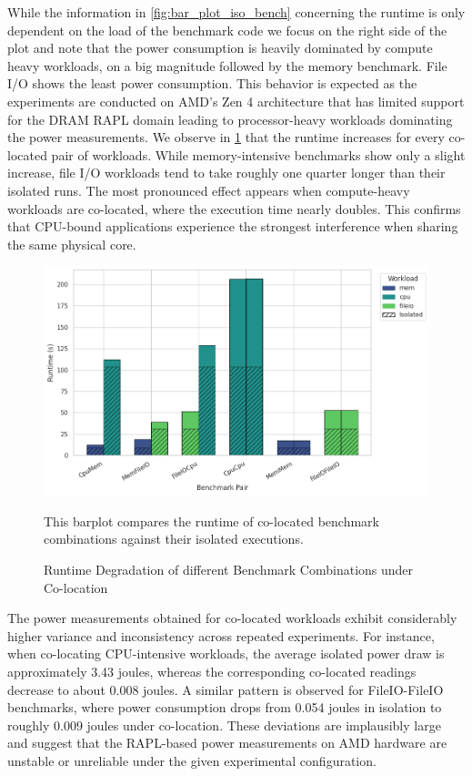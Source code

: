 While the information in \ref{fig:bar_plot_iso_bench} concerning the runtime is only dependent on the load of the benchmark code we focus on the right side of the plot and note that the power consumption is heavily dominated by compute heavy workloads, on a big magnitude followed by the memory benchmark. File I/O shows the least power consumption. This behavior is expected as the experiments are conducted on AMD's Zen 4 architecture that has limited support for the DRAM  RAPL domain leading to processor-heavy workloads dominating the power measurements.
We observe in \ref{fig:bar_plot_colo_bench} that the runtime increases for every co-located pair of workloads. While memory-intensive benchmarks show only a slight increase, file I/O workloads tend to take roughly one quarter longer than their isolated runs. The most pronounced effect appears when compute-heavy workloads are co-located, where the execution time nearly doubles. This confirms that CPU-bound applications experience the strongest interference when sharing the same physical core.

\begin{figure}[H]
    \includegraphics[scale=0.5]{fig/06/06-barplot-colo-bench.png}
    \small
    \caption{Runtime Degradation of different Benchmark Combinations under Co-location}
    \label{fig:bar_plot_colo_bench}
    \tiny
    This barplot compares the runtime of co-located benchmark combinations against their isolated executions.
\end{figure}

The power measurements obtained for co-located workloads exhibit considerably higher variance and inconsistency across repeated experiments. For instance, when co-locating CPU-intensive workloads, the average isolated power draw is approximately 3.43 joules, whereas the corresponding co-located readings decrease to about 0.008 joules. A similar pattern is observed for FileIO-FileIO benchmarks, where power consumption drops from 0.054 joules in isolation to roughly 0.009 joules under co-location. These deviations are implausibly large and suggest that the RAPL-based power measurements on AMD hardware are unstable or unreliable under the given experimental configuration.

